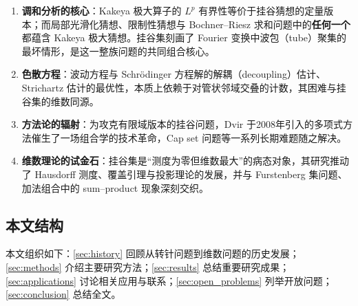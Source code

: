 \begin{enumerate}[label=(\arabic*)]
    \item \textbf{调和分析的核心}：Kakeya 极大算子的 $L^p$ 有界性等价于挂谷猜想的定量版本；而局部光滑化猜想、限制性猜想与 Bochner--Riesz 求和问题中的\textbf{任何一个}都蕴含 Kakeya 极大猜想\cite{tao2001notices}。挂谷集刻画了 Fourier 变换中波包（tube）聚集的最坏情形，是这一整族问题的共同组合核心。
    \item \textbf{色散方程}：波动方程与 Schrödinger 方程解的解耦（decoupling）估计、Strichartz 估计的最优性，本质上依赖于对管状邻域交叠的计数，其困难与挂谷集的维数同源\cite{bourgaindemeter2015}。
    \item \textbf{方法论的辐射}：为攻克有限域版本的挂谷问题，Dvir 于2008年引入的多项式方法\cite{dvir2009}催生了一场组合学的技术革命，Cap set 问题\cite{ellenberggijswijt2017}等一系列长期难题随之解决。
    \item \textbf{维数理论的试金石}：挂谷集是“测度为零但维数最大”的病态对象，其研究推动了 Hausdorff 测度、覆盖引理与投影理论的发展，并与 Furstenberg 集问题、加法组合中的 sum--product 现象深刻交织\cite{tao2001notices}。
\end{enumerate}

\subsection{本文结构}

本文组织如下：\cref{sec:history} 回顾从转针问题到维数问题的历史发展；\cref{sec:methods} 介绍主要研究方法；\cref{sec:results} 总结重要研究成果；\cref{sec:applications} 讨论相关应用与联系；\cref{sec:open_problems} 列举开放问题；\cref{sec:conclusion} 总结全文。
